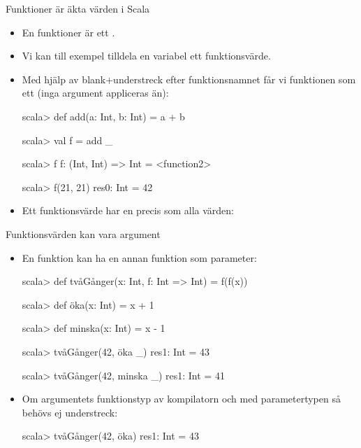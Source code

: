 \begin{Slide}{Funktioner är äkta värden i Scala}\SlideFontSmall
\begin{itemize}
\item En funktioner är ett .
\item Vi kan till exempel tilldela en variabel ett funktionsvärde.
\pause
\item Med hjälp av blank+understreck efter funktionsnamnet får vi funktionen som ett  (inga argument appliceras än):
\begin{REPLnonum}
scala> def add(a: Int, b: Int) = a + b

scala> val f = add _

scala> f
f: (Int, Int) => Int = <function2>

scala> f(21, 21)
res0: Int = 42
\end{REPLnonum}

\item Ett funktionsvärde har en  precis som alla värden: \\
\end{itemize}
\end{Slide}

\begin{Slide}{Funktionsvärden kan vara argument}
\begin{itemize}
\item En funktion kan ha en annan funktion som parameter:
\begin{REPL}
scala> def tvåGånger(x: Int, f: Int => Int) = f(f(x))

scala> def öka(x: Int) = x + 1

scala> def minska(x: Int) = x - 1

scala> tvåGånger(42, öka _)
res1: Int = 43

scala> tvåGånger(42, minska _)
res1: Int = 41
\end{REPL}

\item Om argumentets funktionstyp  av kompilatorn och  med parametertypen så behövs ej understreck: \\
\begin{REPL}
scala> tvåGånger(42, öka)
res1: Int = 43
\end{REPL}\end{itemize}
\end{Slide}



